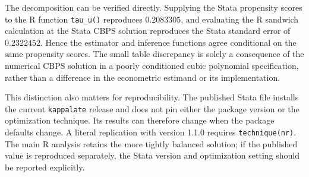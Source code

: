 The decomposition can be verified directly. Supplying the Stata propensity
scores to the R function \texttt{tau\_u()} reproduces \(0.2083305\), and
evaluating the R sandwich calculation at the Stata CBPS solution reproduces
the Stata standard error of \(0.2322452\). Hence the estimator and inference
functions agree conditional on the same propensity scores. The small table
discrepancy is solely a consequence of the numerical CBPS solution in a poorly
conditioned cubic polynomial specification, rather than a difference in the
econometric estimand or its implementation.

This distinction also matters for reproducibility. The published Stata file
installs the current \texttt{kappalate} release and does not pin either the
package version or the optimization technique. Its results can therefore
change when the package defaults change. A literal replication with version
1.1.0 requires \texttt{technique(nr)}. The main R analysis retains the more
tightly balanced solution; if the published value is reproduced separately,
the Stata version and optimization setting should be reported explicitly.
